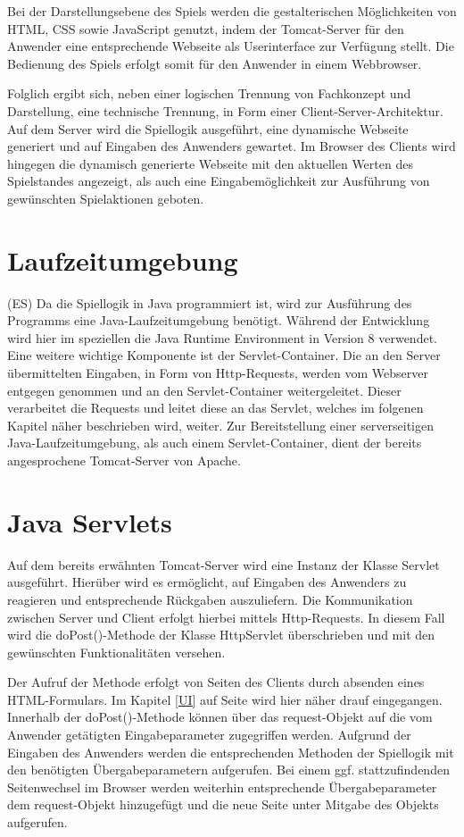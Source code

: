 Bei der Darstellungsebene des Spiels werden die gestalterischen Möglichkeiten von HTML, CSS sowie JavaScript genutzt, indem der Tomcat-Server für den Anwender eine entsprechende Webseite als Userinterface zur Verfügung stellt. Die Bedienung des Spiels erfolgt somit für den Anwender in einem Webbrowser.

Folglich ergibt sich, neben einer logischen Trennung von Fachkonzept und Darstellung, eine technische Trennung, in Form einer Client-Server-Architektur. Auf dem Server wird die Spiellogik ausgeführt, eine dynamische Webseite generiert und auf Eingaben des Anwenders gewartet. Im Browser des Clients wird hingegen die dynamisch generierte Webseite mit den aktuellen Werten des Spielstandes angezeigt, als auch eine Eingabemöglichkeit zur Ausführung von gewünschten Spielaktionen geboten.

\section{Laufzeitumgebung}
(ES) Da die Spiellogik in Java programmiert ist, wird zur Ausführung des Programms eine Java-Laufzeitumgebung benötigt. Während der Entwicklung wird hier im speziellen die Java Runtime Environment in Version 8 verwendet. Eine weitere wichtige Komponente ist der Servlet-Container. Die an den Server übermittelten Eingaben, in Form von Http-Requests, werden vom Webserver entgegen genommen und an den Servlet-Container weitergeleitet. Dieser verarbeitet die Requests und leitet diese an das Servlet, welches im folgenen Kapitel näher beschrieben wird, weiter. Zur Bereitstellung einer serverseitigen Java-Laufzeitumgebung, als auch einem Servlet-Container, dient der bereits angesprochene Tomcat-Server von Apache.

\section{Java Servlets}\label{sec:Servlets}
Auf dem bereits erwähnten Tomcat-Server wird eine Instanz der Klasse Servlet ausgeführt. Hierüber wird es ermöglicht, auf Eingaben des Anwenders zu reagieren und entsprechende Rückgaben auszuliefern. Die Kommunikation zwischen Server und Client erfolgt hierbei mittels Http-Requests. In diesem Fall wird die doPost()-Methode der Klasse HttpServlet überschrieben und mit den gewünschten Funktionalitäten versehen.

Der Aufruf der Methode erfolgt von Seiten des Clients durch absenden eines HTML-Formulars. Im Kapitel \ref{UI} auf Seite \pageref{UI} wird hier näher drauf eingegangen. Innerhalb der doPost()-Methode können über das request-Objekt auf die vom Anwender getätigten Eingabeparameter zugegriffen werden. Aufgrund der Eingaben des Anwenders werden die entsprechenden Methoden der Spiellogik mit den benötigten Übergabeparametern aufgerufen. Bei einem ggf. stattzufindenden Seitenwechsel im Browser werden weiterhin entsprechende Übergabeparameter dem request-Objekt hinzugefügt und die neue Seite unter Mitgabe des Objekts aufgerufen.

